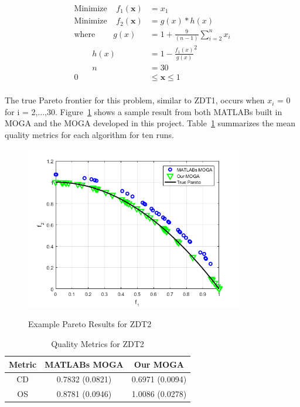 \documentclass{article}
\begin{document}
\begin{align*}
\textrm{Minimize} ~~~~~ f_1(\textbf{x}) &= x_1 \\
\textrm{Minimize} ~~~~~ f_2(\textbf{x}) &= g(x)*h(x) \\
\textrm{where} ~~~~~~~~~~ g(x) &= 1+\frac{9}{(n-1)}\sum_{i=2}^{n}x_i \\
~~~~~~~~~~ h(x) &= 1- \frac{f_1(x)}{g(x)}^2 \\
~~~~~~~~~~ n &= 30 \\
0 &\leq  \textbf{x}  \leq 1 \\
\end{align*}

The true Pareto frontier for this problem, similar to ZDT1, occurs when $x_i$ = 0 for i = 2,...,30. Figure~\ref{fig:ZDT2} shows a sample result from both MATLABs built in MOGA and the MOGA developed in this project. Table~\ref{tab:ZDT2} summarizes the mean quality metrics for each algorithm for ten runs.
\begin{figure}[h!]
  \caption{Example Pareto Results for ZDT2}
  \centering
  \includegraphics[width=0.85\textwidth]{ZDT2_pareto_final.png}  
  \label{fig:ZDT2}
\end{figure}

\begin{table}[h]
\caption{Quality Metrics for ZDT2} 
\centering 
\begin{tabular}{|c|c|c|} 
\hline\hline  
Metric & MATLABs MOGA & Our MOGA \\ \hline
CD & 0.7832  (0.0821) & 0.6971  (0.0094) \\ \hline
OS &  0.8781 (0.0946) & 1.0086 (0.0278)  \\ \hline
\end{tabular}
\label{tab:ZDT2} 
\end{table}
\end{document}
